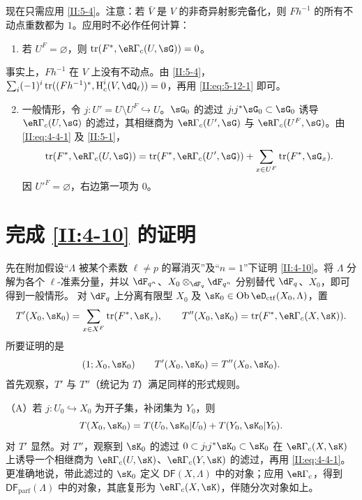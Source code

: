 \subsection{}\label{II:5-13}
现在只需应用 \ref{II:5-4}。注意：若 $\bar V$ 是 $V$ 的非奇异射影完备化，则 $Fh^{-1}$ 的所有不动点重数都为 $1$。应用时不必作任何计算：
\begin{enumerate}[\indent A.]
\item 若 $U^F=\varnothing$，则 $\tr(F^*,\eR\Gamma_c(U,\sG))=0$。
\end{enumerate}
事实上，$Fh^{-1}$ 在 $V$ 上没有不动点。由 \ref{II:5-4}，$\sum_i(-1)^i\tr((Fh^{-1})^*,\h_c^i(V,\dQ_\ell))=0$，再用 \eqref{II:eq:5-12-1} 即可。
\begin{enumerate}[\indent A.]
\setcounter{enumi}{1}
\item 一般情形，令 $j:U'=U\setminus U^F\hookrightarrow U$。$\sG_0$ 的滤过 $j_!j^*\sG_0\subset\sG_0$ 诱导 $\eR\Gamma_c(U,\sG)$ 的滤过，其相继商为 $\eR\Gamma_c(U',\sG)$ 与 $\eR\Gamma_c(U^F,\sG)$。由 \eqref{II:eq:4-4-1} 及 \ref{II:5-1}，
\[\tr(F^*,\eR\Gamma_c(U,\sG))=\tr(F^*,\eR\Gamma_c(U',\sG))+\sum_{x\in U^F}\tr(F^*,\sG_x).\]
因 ${U'}^F=\varnothing$，右边第一项为 $0$。
\end{enumerate}

\section{完成 \texorpdfstring{\ref{II:4-10}}{4.10} 的证明}\label{II:6}
先在附加假设“$\Lambda$ 被某个素数 $\ell\ne p$ 的幂消灭”及“$n=1$”下证明 \ref{II:4-10}。将 $\Lambda$ 分解为各个 $\ell$-准素分量，并以 $\dF_{q^n}$、$X_0\otimes_{\dF_q}\dF_{q^n}$ 分别替代 $\dF_q$、$X_0$，即可得到一般情形。
对 $\dF_q$ 上分离有限型 $X_0$ 及 $\sK_0\in\ob\eD_{\mathrm{ctf}}(X_0,\Lambda)$，置
\[T'(X_0,\sK_0)=\sum_{x\in X^F}\tr(F^*,\sK_x),\qquad T''(X_0,\sK_0)=\tr(F^*,\eR\Gamma_c(X,\sK)).\]
所要证明的是
\[(1;X_0,\sK_0)\qquad T'(X_0,\sK_0)=T''(X_0,\sK_0).\]
首先观察，$T'$ 与 $T''$（统记为 $T$）满足同样的形式规则。

\noindent（A）若 $j:U_0\hookrightarrow X_0$ 为开子集，补闭集为 $Y_0$，则
\[T(X_0,\sK_0)=T(U_0,\sK_0|U_0)+T(Y_0,\sK_0|Y_0).\]
对 $T'$ 显然。对 $T''$，观察到 $\sK_0$ 的滤过 $0\subset j_!j^*\sK_0\subset\sK_0$ 在 $\eR\Gamma_c(X,\sK)$ 上诱导一个相继商为 $\eR\Gamma_c(U,\sK)$、$\eR\Gamma_c(Y,\sK)$ 的滤过，再用 \eqref{II:eq:4-4-1}。更准确地说，带此滤过的 $\sK_0$ 定义 $\mathsf{DF}(X,\Lambda)$ 中的对象；应用 $\eR\Gamma_c$，得到 $\mathsf{DF}_{\mathrm{parf}}(\Lambda)$ 中的对象，其底复形为 $\eR\Gamma_c(X,\sK)$，伴随分次对象如上。


